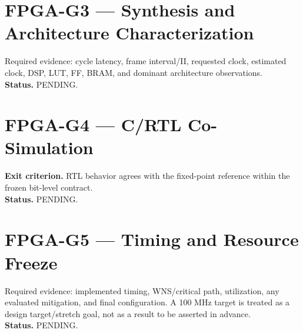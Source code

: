 \section{FPGA-G3 --- Synthesis and Architecture Characterization}
Required evidence: cycle latency, frame interval/II, requested clock, estimated clock,
DSP, LUT, FF, BRAM, and dominant architecture observations.\\
\textbf{Status.} PENDING.

\section{FPGA-G4 --- C/RTL Co-Simulation}
\textbf{Exit criterion.} RTL behavior agrees with the fixed-point reference within the
frozen bit-level contract.\\
\textbf{Status.} PENDING.

\section{FPGA-G5 --- Timing and Resource Freeze}
Required evidence: implemented timing, WNS/critical path, utilization, any evaluated
mitigation, and final configuration. A 100 MHz target is treated as a design target/stretch
goal, not as a result to be asserted in advance.\\
\textbf{Status.} PENDING.

